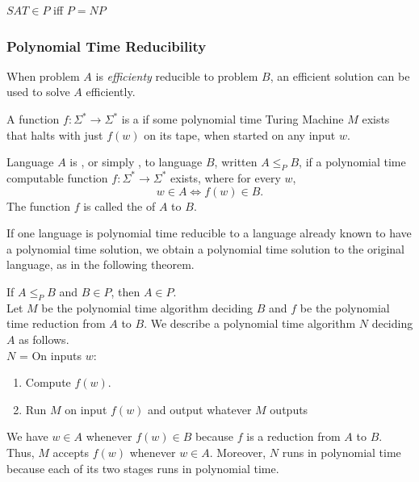 \documentclass{article}
\begin{document}
\begin{theorem}
  $SAT \in P$ iff $P = NP$
\end{theorem}

\subsubsection{Polynomial Time Reducibility}

When problem $A$ is \emph{efficienty} reducible to problem $B$, an efficient solution can be used to solve $A$ efficiently. 

\begin{definition}
  A function $f: \Sigma^{*} \rightarrow \Sigma^{*}$ is a  if some polynomial time Turing Machine $M$ exists that halts with just $f(w)$ on its tape, when started on any input $w$. 
\end{definition}

\begin{definition}
  Language $A$ is , or simply , to language $B$, written $A \leq_{P} B$, if a polynomial time computable function $f: \Sigma^{*} \rightarrow \Sigma^{*}$ exists, where for every $w$, $$w \in A \Leftrightarrow f(w) \in B.$$ The function $f$ is called the  of $A$ to $B$. 
\end{definition}

If one language is polynomial time reducible to a language already known to have a polynomial time solution, we obtain a polynomial time solution to the original language, as in the following theorem. 

\begin{theorem}
  If $A \leq_{P} B$ and $B \in P$, then $A \in P$. \\ 
   Let $M$ be the polynomial time algorithm deciding $B$ and $f$ be the polynomial time reduction from $A$ to $B$. We describe a polynomial time algorithm $N$ deciding $A$ as follows. \\ 
  $N$ = On inputs $w$: 
  \begin{enumerate}
    \item Compute $f(w)$. 
    \item Run $M$ on input $f(w)$ and output whatever $M$ outputs
  \end{enumerate}
  We have $w \in A$ whenever $f(w) \in B$ because $f$ is a reduction from $A$ to $B$. Thus, $M$ accepts $f(w)$ whenever $w \in A$. Moreover, $N$ runs in polynomial time because each of its two stages runs in polynomial time.
\end{theorem}
\end{document}
